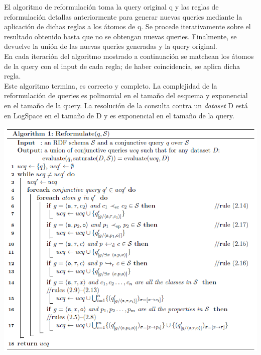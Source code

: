 \documentclass[10pt,a4paper]{article}
\begin{document}
El algoritmo de reformulación toma la query original q y las reglas de reformulación detallas anteriormente para generar nuevas queries mediante la aplicación de dichas reglas a los átomos de q. Se procede iterativamente sobre el resultado obtenido hasta que no se obtengan nuevas queries. Finalmente, se devuelve la unión de las nuevas queries generadas y la query original.\\

En cada iteración del algoritmo mostrado a continuación se matchean los átomos de la query con el input de cada regla; de haber coincidencia, se aplica dicha regla.\\

Este algoritmo termina, es correcto y completo. La complejidad de la reformulación de queries es polinomial en el tamaño del esquema y exponencial en el tamaño de la query. La resolución de la consulta contra un \textit{dataset} D está en LogSpace en el tamaño de D y es exponencial en el tamaño de la query.\\

\vspace{100 mm}

\begin{center}
\includegraphics[scale=0.55]{imgs/06.png}
\end{center}
\end{document}
